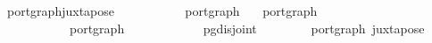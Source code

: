 \ port{\isacharunderscore}graph{\isacharunderscore}juxtapose{\isacharcolon}\isanewline
\ \ \ \ \ \ {\isacharcolon}{\isacharcolon}\isanewline
{}\ \ \ \ port{\isacharunderscore}graph{\isachardoublequoteclose}\isanewline
\ \ \ {\isachardoublequoteopen}port{\isacharunderscore}graph\ \isanewline
\ \ \ \ \ \ \ \ \ \ \ {\isachardoublequoteopen}port{\isacharunderscore}graph\ \isanewline
\ \ \ \ \ \ \ \ \ \ \ {\isachardoublequoteopen}pg{\isacharunderscore}disjoint\ \isanewline
\ \ \ \ \ \ \ {\isachardoublequoteopen}port{\isacharunderscore}graph\ {\isacharparenleft}juxtapose\ 
